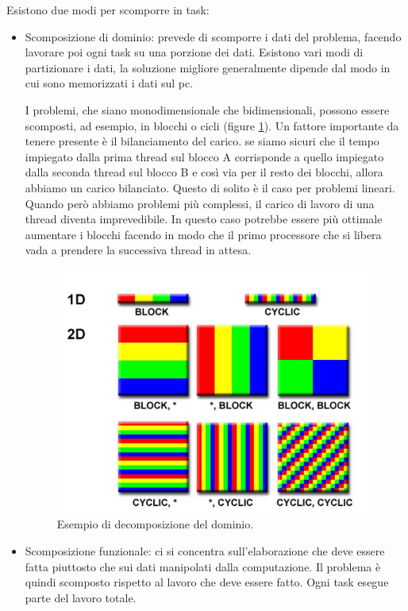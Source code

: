 Esistono due modi per scomporre in task:
\begin{itemize}
    \item Scomposizione di dominio: prevede di scomporre i dati del problema, facendo lavorare poi ogni task su una porzione dei dati. Esistono vari modi di partizionare i dati, la soluzione migliore generalmente dipende dal modo in cui sono memorizzati i dati sul pc.

    I problemi, che siano monodimensionale che bidimensionali, possono essere scomposti, ad esempio, in blocchi o cicli (figure \ref{fig:domain-decomposition}). Un fattore importante da tenere presente è il bilanciamento del carico. se siamo sicuri che il tempo impiegato dalla prima thread sul blocco A corrisponde a quello impiegato dalla seconda thread sul blocco B e così via per il resto dei blocchi, allora abbiamo un carico bilanciato. Questo di solito è il caso per problemi lineari. Quando però abbiamo problemi più complessi, il carico di lavoro di una thread diventa imprevedibile. In questo caso potrebbe essere più ottimale aumentare i blocchi facendo in modo che il primo processore che si libera vada a prendere la successiva thread in attesa.
    \begin{figure}[th]
    	\centering
    	\includegraphics[width=0.7\linewidth]{img/domain-decomposition.png}
    	\caption{Esempio di decomposizione del dominio.}
    	\label{fig:domain-decomposition}
    \end{figure}

    \item Scomposizione funzionale: ci si concentra sull'elaborazione che deve essere fatta piuttosto che sui dati manipolati dalla computazione. Il problema è quindi scomposto rispetto al lavoro che deve essere fatto. Ogni task esegue parte del lavoro totale.
\end{itemize}


